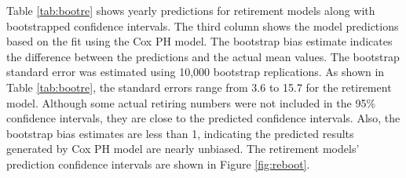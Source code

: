 Table \ref{tab:bootre} shows yearly predictions for retirement models along with bootstrapped confidence intervals. The third column shows the model predictions based on the fit using the Cox PH model. The bootstrap bias estimate indicates the difference between the predictions and the actual mean values. The bootstrap standard error was estimated using 10,000 bootstrap replications. As shown in Table \ref{tab:bootre}, the standard errors range from 3.6 to 15.7 for the retirement model. Although some actual retiring numbers were not included in the 95\% confidence intervals, they are close to the predicted confidence intervals. Also, the bootstrap bias estimates are less than 1, indicating the predicted results generated by Cox PH model are nearly unbiased. The retirement models' prediction confidence intervals are shown in Figure \ref{fig:reboot}.

